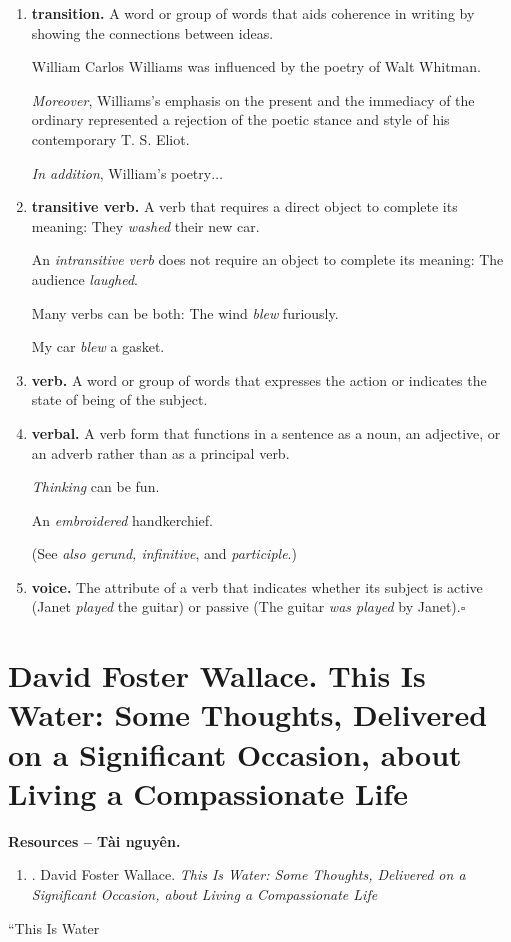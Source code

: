 \documentclass{article}
\begin{document}
\begin{enumerate}
	{\it Saw, see, will see}.
	\item {\bf transition.} A word or group of words that aids coherence in writing by showing the connections between ideas.
	
	William Carlos Williams was influenced by the poetry of Walt Whitman.
	
	{\it Moreover}, Williams's emphasis on the present and the immediacy of the ordinary represented a rejection of the poetic stance and style of his contemporary T. S. Eliot.
	
	{\it In addition}, William's poetry$\ldots$
	\item {\bf transitive verb.} A verb that requires a direct object to complete its meaning: They {\it washed} their new car.
	
	An {\it intransitive verb} does not require an object to complete its meaning: The audience {\it laughed}.
	
	Many verbs can be both: The wind {\it blew} furiously.
	
	My car {\it blew} a gasket.
	\item {\bf verb.} A word or group of words that expresses the action or indicates the state of being of the subject.
	
	\item {\bf verbal.} A verb form that functions in a sentence as a noun, an adjective, or an adverb rather than as a principal verb.
	
	{\it Thinking} can be fun.
	
	An {\it embroidered} handkerchief.
	
	(See {\it also gerund, infinitive}, and {\it participle}.)
	\item {\bf voice.} The attribute of a verb that indicates whether its subject is active (Janet {\it played} the guitar) or passive (The guitar {\it was played} by Janet).\hfill$\square$
\end{enumerate}


\section{{\sc David Foster Wallace}. This Is Water: Some Thoughts, Delivered on a Significant Occasion, about Living a Compassionate Life}
\textbf{\textsf{Resources -- Tài nguyên.}}
\begin{enumerate}
	\item \cite{Wallace_water}. {\sc David Foster Wallace}. {\it This Is Water: Some Thoughts, Delivered on a Significant Occasion, about Living a Compassionate Life}
\end{enumerate}
``This Is Water
\end{document}

